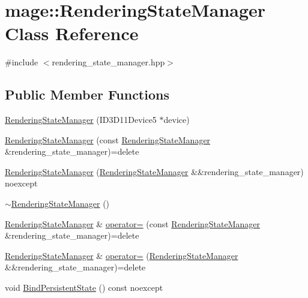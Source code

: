 \hypertarget{classmage_1_1_rendering_state_manager}{}\section{mage\+:\+:Rendering\+State\+Manager Class Reference}
\label{classmage_1_1_rendering_state_manager}


{\ttfamily \#include $<$rendering\+\_\+state\+\_\+manager.\+hpp$>$}

\subsection*{Public Member Functions}
\begin{DoxyCompactItemize}
\item 
\hyperlink{classmage_1_1_rendering_state_manager_a7e2ae8265b322b0700fd5ade4b791aea}{Rendering\+State\+Manager} (I\+D3\+D11\+Device5 $\ast$device)
\item 
\hyperlink{classmage_1_1_rendering_state_manager_af73792aa9689050ee050b641ffbefe39}{Rendering\+State\+Manager} (const \hyperlink{classmage_1_1_rendering_state_manager}{Rendering\+State\+Manager} \&rendering\+\_\+state\+\_\+manager)=delete
\item 
\hyperlink{classmage_1_1_rendering_state_manager_af02da2f330781b44349684ddb06fde0b}{Rendering\+State\+Manager} (\hyperlink{classmage_1_1_rendering_state_manager}{Rendering\+State\+Manager} \&\&rendering\+\_\+state\+\_\+manager) noexcept
\item 
\hyperlink{classmage_1_1_rendering_state_manager_ad4865219aaaac55dd53c4ab51af8d63f}{$\sim$\+Rendering\+State\+Manager} ()
\item 
\hyperlink{classmage_1_1_rendering_state_manager}{Rendering\+State\+Manager} \& \hyperlink{classmage_1_1_rendering_state_manager_a4f2ee3e88ad79660e867a4a945ebe951}{operator=} (const \hyperlink{classmage_1_1_rendering_state_manager}{Rendering\+State\+Manager} \&rendering\+\_\+state\+\_\+manager)=delete
\item 
\hyperlink{classmage_1_1_rendering_state_manager}{Rendering\+State\+Manager} \& \hyperlink{classmage_1_1_rendering_state_manager_ac8ab6290fb1801ed1acc5b50c8749b6b}{operator=} (\hyperlink{classmage_1_1_rendering_state_manager}{Rendering\+State\+Manager} \&\&rendering\+\_\+state\+\_\+manager)=delete
\item 
void \hyperlink{classmage_1_1_rendering_state_manager_aadbe543fdb458104c42fe9182848805e}{Bind\+Persistent\+State} () const noexcept

\end{DoxyCompactItemize}
